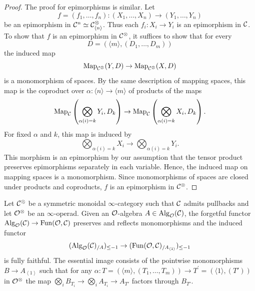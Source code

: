 \documentclass[10pt,a4paper,oneside]{article}
\begin{document}
\begin{proof}
The proof for epimorphisms is similar. Let
$$
f=(f_1,\ldots,f_n):(X_1,\ldots,X_n)\to (Y_1,\ldots,Y_n)
$$
be an epimorphism in $\mathcal{C}^n\simeq \mathcal{C}^\otimes_{\langle n\rangle}$. Thus each $f_i:X_i\to Y_i$ is an epimorphism in $\mathcal{C}$. To show that $f$ is an epimorphism in $\mathcal{C}^\otimes$, it suffices to show that for every
$$
D=\left(\langle m\rangle,\left(D_1,\ldots,D_m\right)\right)
$$
the induced map
$$
\operatorname{Map}_{\mathcal{C}^\otimes}(Y,D)\to \operatorname{Map}_{\mathcal{C}^\otimes}(X,D)
$$
is a monomorphism of spaces. By the same description of mapping spaces, this map is the coproduct over $\alpha:\langle n\rangle\to\langle m\rangle$ of products of the maps
$$
\operatorname{Map}_{\mathcal{C}}\left(\bigotimes_{\alpha(i)=k}Y_i,D_k\right)
\to
\operatorname{Map}_{\mathcal{C}}\left(\bigotimes_{\alpha(i)=k}X_i,D_k\right).
$$
For fixed $\alpha$ and $k$, this map is induced by
$$
\bigotimes_{\alpha(i)=k}X_i
\to
\bigotimes_{\alpha(i)=k}Y_i .
$$
This morphism is an epimorphism by our assumption that the tensor product preserves epimorphisms separately in each variable. Hence, the induced map on mapping spaces is a monomorphism. Since monomorphisms of spaces are closed under products and coproducts, $f$ is an epimorphism in $\mathcal{C}^\otimes$.
\end{proof}

\begin{prop}
Let $\mathcal{C}^\otimes$ be a symmetric monoidal $\infty$-category such that $\mathcal{C}$ admits pullbacks and let $\mathcal{O}^\otimes$ be an $\infty$-operad. Given an $\mathcal{O}$-algebra $A\in\operatorname{Alg}_{\mathcal{O}}(\mathcal{C})$, the forgetful functor $\operatorname{Alg}_{\mathcal{O}}(\mathcal{C})\to \operatorname{Fun}(\mathcal{O},\mathcal{C})$ preserves and reflects monomorphisms and the induced functor
$$(\operatorname{Alg}_{\mathcal{O}}(\mathcal{C})_{/A})_{\leq-1}\to (\operatorname{Fun}(\mathcal{O},\mathcal{C})_{/A_{\left<1\right>}})_{\leq-1}$$ is fully faithful. The essential image consists of the pointwise monomorphisms $B\to A_{\left<1\right>}$ such that for any $\alpha: T=\left(\langle m\rangle,\left(T_1, \ldots, T_m\right)\right)\to T^{\prime}=\left(\langle 1\rangle,(T')\right)$ in $ \mathcal{O}^\otimes$ the map $\bigotimes_{i}B_{T_i}\to \bigotimes_{i}A_{T_i}\to A_{T'}$ factors through $B_{T'}$.
\end{prop}
\end{document}
